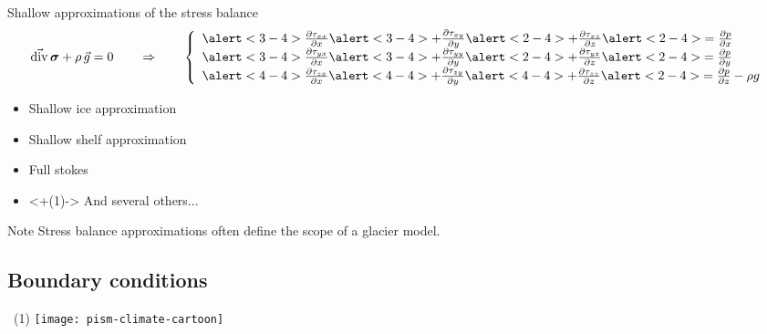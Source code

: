 \documentclass{beamer}
\newcommand{\footlineextra}[1]{\gdef\insertfootlineextra{#1}}
\begin{document}
\begin{frame}{Shallow approximations of the stress balance}
	$$\vec{\mathrm{div}} \, \bm\sigma + \rho \, \vec{g} = 0
		\qquad\Rightarrow\qquad\left\{\begin{array}{l}
		\alert<3-4>{\frac{\partial\tau_{xx}}{\partial x}}
		\alert<3-4>{+\frac{\partial\tau_{xy}}{\partial y}}
		\alert<2-4>{+\frac{\partial\tau_{xz}}{\partial z}}
		\alert<2-4>{=\frac{\partial p}{\partial x}}\\
		\alert<3-4>{\frac{\partial\tau_{yx}}{\partial x}}
		\alert<3-4>{+\frac{\partial\tau_{yy}}{\partial y}}
		\alert<2-4>{+\frac{\partial\tau_{yz}}{\partial z}}
		\alert<2-4>{=\frac{\partial p}{\partial y}}\\
		\alert<4-4>{\frac{\partial\tau_{zx}}{\partial x}}
		\alert<4-4>{+\frac{\partial\tau_{zy}}{\partial y}}
		\alert<4-4>{+\frac{\partial\tau_{zz}}{\partial z}}
		\alert<2-4>{=\frac{\partial p}{\partial z} - \rho g}
		\end{array}\right.$$
	\begin{itemize}[<+(1)-| alert@+(1)>]
		\item Shallow ice approximation
		\item Shallow shelf approximation
		\item Full stokes
		\item<+(1)-> And several others...
	\end{itemize}
	\pause
	\begin{block}{Note}
		Stress balance approximations often define the scope of a glacier model.
	\end{block}
\end{frame}

\subsection{Boundary conditions}

\begin{frame}{\insertsubsection\ (1)}
	\texttt{[image: pism-climate-cartoon]}
	\footlineextra{Source: PISM documentation (http://pism-docs.org)}
\end{frame}
\end{document}
